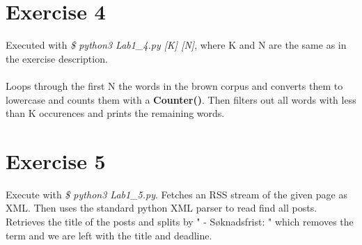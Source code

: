 \documentclass{article}
\begin{document}
	\section{Exercise 4}
	
	Executed with \textit{\$ python3 Lab1\_4.py  [K]  [N]}, where K and N are the same as in the exercise description. \\ \\
	Loops through the first N the words in the brown corpus and converts them to lowercase and counts them with a \textbf{Counter()}. Then filters out all words with less than K occurences and prints the remaining words.
	
	
	\section{Exercise 5}
	Execute with \textit{\$ python3 Lab1\_5.py}. Fetches an RSS stream of the given page as XML. Then uses the standard python XML parser to read find all posts. Retrieves the title of the posts and splits by " - Søknadsfrist: " which removes the term and we are left with the title and deadline.
	
	
\end{document}
